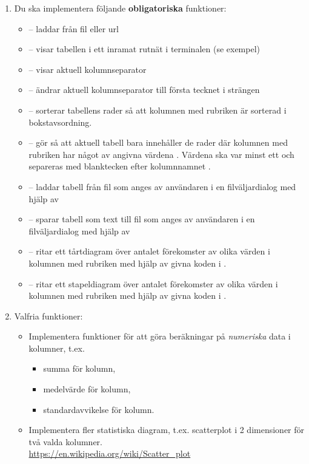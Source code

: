 \begin{enumerate}[leftmargin=*]
\item Du ska implementera följande \textbf{obligatoriska} funktioner:
\begin{itemize}[nosep, label={$\square$},]
\item {} -- laddar  från fil eller url
\item {} -- visar tabellen i ett inramat rutnät i terminalen (se exempel)
\item {} -- visar aktuell kolumnseparator
\item {} -- ändrar aktuell kolumnseparator till första tecknet i strängen 
\item {} -- sorterar tabellens rader så att kolumnen med rubriken  är sorterad i bokstavsordning.
\item {} -- gör så att aktuell tabell bara innehåller de rader där kolumnen med rubriken  har något av angivna värdena . Värdena ska var minst ett och separeras med blanktecken efter kolumnnamnet .
\item {} -- laddar tabell från fil som anges av användaren i en filväljardialog med hjälp av 
\item {} -- sparar tabell som text till fil som anges av användaren i en filväljardialog med hjälp av 
\item {} -- ritar ett tårtdiagram över antalet förekomster av olika värden i kolumnen med rubriken  med hjälp av givna koden i .
\item {} -- ritar ett stapeldiagram över antalet förekomster av olika värden i kolumnen med rubriken  med hjälp av givna koden i .

\end{itemize}

\item Valfria funktioner:
\begin{itemize}[nosep, label={$\square$},]
\item Implementera funktioner för att göra beräkningar på \emph{numeriska} data i kolumner, t.ex. 
\begin{itemize}
  \item summa för kolumn, \item medelvärde för kolumn, \item standardavvikelse för kolumn.
\end{itemize}
\item Implementera fler statistiska diagram, t.ex. scatterplot i 2 dimensioner för två valda kolumner. \\\url{https://en.wikipedia.org/wiki/Scatter_plot} 
\end{itemize}

\end{enumerate}

